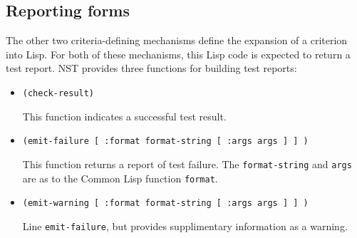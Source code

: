 \subsection{Reporting forms}
The other two criteria-defining mechanisms define the expansion of a
criterion into Lisp.  For both of these mechanisms, this Lisp code is
expected to return a test report.  NST provides three functions for
building test reports:
\begin{itemize}
\item\texttt{(check-result)}\par This function indicates a successful
  test result.
\item\texttt{(emit-failure [ :format format-string [ :args args ] ] )}
  \par This function returns a report of test failure.  The
  \texttt{format-string} and \texttt{args} are as to the Common Lisp
  function \texttt{format}.
\item\texttt{(emit-warning [ :format format-string [ :args args ] ] )}
  \par Line \texttt{emit-failure}, but provides supplimentary
  information as a warning.
\end{itemize}

